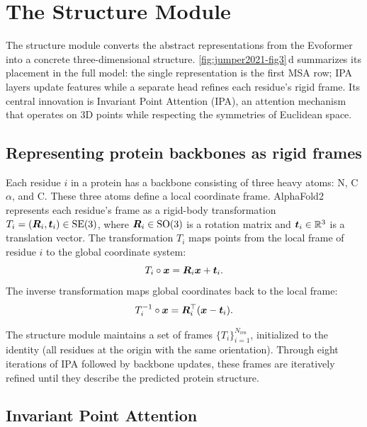 \section{The Structure Module}
\label{sec:af2-structure}

The structure module converts the abstract representations from the Evoformer into a concrete three-dimensional structure.
\cref{fig:jumper2021-fig3}\,d summarizes its placement in the full model: the single representation is the first MSA row; IPA layers update features while a separate head refines each residue's rigid frame.
Its central innovation is Invariant Point Attention (IPA), an attention mechanism that operates on 3D points while respecting the symmetries of Euclidean space.

\subsection*{Representing protein backbones as rigid frames}
\label{sec:af2-frames}

Each residue $i$ in a protein has a backbone consisting of three heavy atoms: N, C$\alpha$, and C.
These three atoms define a local coordinate frame.
AlphaFold2 represents each residue's frame as a rigid-body transformation $T_i = (\bm{R}_i, \bm{t}_i) \in \mathrm{SE}(3)$, where $\bm{R}_i \in \mathrm{SO}(3)$ is a rotation matrix and $\bm{t}_i \in \mathbb{R}^3$ is a translation vector.
The transformation $T_i$ maps points from the local frame of residue $i$ to the global coordinate system:
\begin{equation}
\label{eq:frame-transform}
T_i \circ \bm{x} = \bm{R}_i \bm{x} + \bm{t}_i.
\end{equation}
The inverse transformation maps global coordinates back to the local frame:
\begin{equation}
\label{eq:frame-inverse}
T_i^{-1} \circ \bm{x} = \bm{R}_i^\top (\bm{x} - \bm{t}_i).
\end{equation}

The structure module maintains a set of frames $\{T_i\}_{i=1}^{N_\text{res}}$, initialized to the identity (all residues at the origin with the same orientation).
Through eight iterations of IPA followed by backbone updates, these frames are iteratively refined until they describe the predicted protein structure.

\subsection*{Invariant Point Attention}
\label{sec:af2-ipa}

